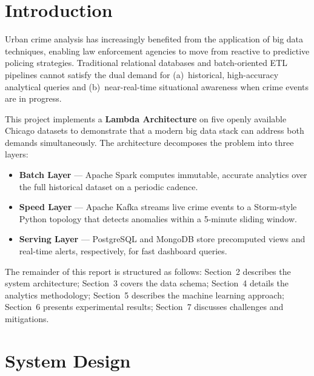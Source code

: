 \documentclass[11pt,a4paper]{article}
\begin{document}
\tableofcontents
\newpage

\section{Introduction}

Urban crime analysis has increasingly benefited from the application of
big data techniques, enabling law enforcement agencies to move from
reactive to predictive policing strategies. Traditional relational
databases and batch-oriented ETL pipelines cannot satisfy the dual demand
for (a)~historical, high-accuracy analytical queries and (b)~near-real-time
situational awareness when crime events are in progress.

This project implements a \textbf{Lambda Architecture} on five openly
available Chicago datasets to demonstrate that a modern big data stack
can address both demands simultaneously. The architecture decomposes the
problem into three layers:

\begin{itemize}[noitemsep]
  \item \textbf{Batch Layer} — Apache Spark computes immutable, accurate
    analytics over the full historical dataset on a periodic cadence.
  \item \textbf{Speed Layer} — Apache Kafka streams live crime events to a
    Storm-style Python topology that detects anomalies within a 5-minute
    sliding window.
  \item \textbf{Serving Layer} — PostgreSQL and MongoDB store precomputed
    views and real-time alerts, respectively, for fast dashboard queries.
\end{itemize}

The remainder of this report is structured as follows:
Section~2 describes the system architecture;
Section~3 covers the data schema;
Section~4 details the analytics methodology;
Section~5 describes the machine learning approach;
Section~6 presents experimental results;
Section~7 discusses challenges and mitigations.

\section{System Design}
\end{document}
